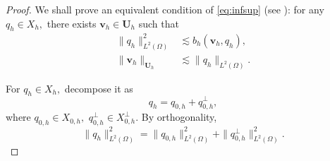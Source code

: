 \documentclass[a4paper,11pt,fleqn]{article}
\numberwithin{equation}{section}
\begin{document}
\begin{proof}
	We shall prove an equivalent condition of \eqref{eq:infsup} (see \cite{Olshanskii2006}): for any $q_h \in X_h,$ there exists $\boldsymbol{v}_h \in \boldsymbol{U}_h$ such that
	\begin{align}\label{eq:vherr}
		\|q_h\|^2_{L^2(\Omega)} &\lesssim b_h(\boldsymbol{v}_h,q_h), \\
		\|\boldsymbol{v}_h\|_{\boldsymbol{U}_h} &\lesssim \|q_h\|_{L^2(\Omega)}.
	\end{align}
	
	For $q_h \in X_h,$ decompose it as
	\begin{equation*}
		q_h = q_{0,h} + q^{\perp}_{0,h},
	\end{equation*} 
	where $q_{0,h} \in X_{0,h},$ $q^{\perp}_{0,h} \in X^{\perp}_{0,h}.$ By orthogonality,
	\begin{equation*}
		\|q_h\|^2_{L^2(\Omega)} = \|q_{0,h}\|^2_{L^2(\Omega)} + \|q^{\perp}_{0,h}\|^2_{L^2(\Omega)}.
	\end{equation*} 
	

\end{proof}
\end{document}
